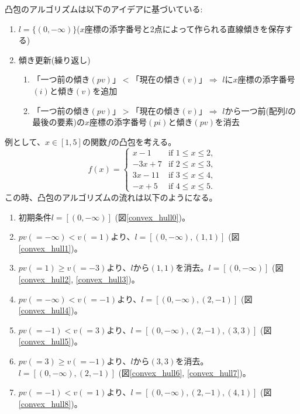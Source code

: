 凸包のアルゴリズムは以下のアイデアに基づいている:
\begin{enumerate}
    \item $l = \{(0, - \infty)\}$($x$座標の添字番号と2点によって作られる直線傾きを保存する) 
    \item 傾き更新(繰り返し)
    \begin{enumerate}
        \item 「一つ前の傾き$(pv)$」$ < $「現在の傾き$(v)$」$\Rightarrow$ $l$に$x$座標の添字番号$(i)$と傾き$(v)$を追加
        \item 「一つ前の傾き$(pv)$」$ > $「現在の傾き$(v)$」$\Rightarrow$ $l$から一つ前(配列$l$の最後の要素)の$x$座標の添字番号$(pi)$と傾き$(pv)$を消去
    \end{enumerate}
\end{enumerate}

例として、$x \in [1,5]$の関数$f$の凸包を考える。
\begin{equation*}
    f(x)=
    \begin{cases}
        x - 1 & \text{if $1 \le x \le 2$,} \\
        -3x + 7 & \text{if $2 \le x \le 3$,} \\
        3x - 11 & \text{if $3 \le x \le 4$,} \\
        -x + 5 & \text{if $4 \le x \le 5$.}
    \end{cases}
\end{equation*}
この時、凸包のアルゴリズムの流れは以下のようになる。
\begin{enumerate}
    \item 初期条件$l = [(0, -\infty)]$ (図\ref{convex_hull0})。
    \item $pv(=- \infty) < v(=1)$より、$l = [(0, -\infty), (1,1)]$ (図\ref{convex_hull1})。
    \item $pv(= 1) \ge v(=-3)$より、$l$から$(1, 1)$を消去。$l = [(0, -\infty)]$ (図\ref{convex_hull2}, \ref{convex_hull3})。
    \item $pv(=- \infty) < v(=-1)$より、$l = [(0, -\infty), (2,-1)]$ (図\ref{convex_hull4})。
    \item $pv(=- 1) < v(=3)$より、$l = [(0, -\infty), (2,-1), (3,3)]$ (図\ref{convex_hull5})。
    \item $pv(= 3) \ge v(=-1)$より、$l$から$(3, 3)$を消去。$l = [(0, -\infty), (2,-1)]$ (図\ref{convex_hull6}, \ref{convex_hull7})。
    \item $pv(=- 1) < v(=1)$より、$l = [(0, -\infty), (2,-1), (4,1)]$ (図\ref{convex_hull8})。
\end{enumerate}

